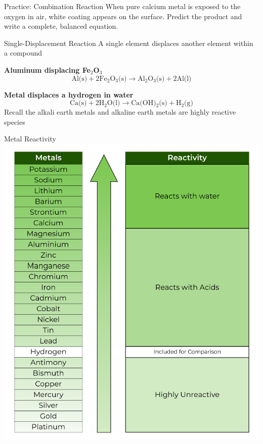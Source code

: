\documentclass[11pt]{beamer}
\begin{document}
\begin{frame}{Practice: Combination Reaction}
  When pure calcium metal is exposed to the oxygen in air, white coating appears
  on the surface. Predict the product and write a complete, balanced equation.
\end{frame}

\begin{frame}{Single-Displacement Reaction}
  A single element displaces another element within a compound

  \textbf{Aluminum displacing Fe$_2$O$_3$}
  \begin{equation}
    \text{Al(s)} + 2\text{Fe$_2$O$_3$(s)} \rightarrow \text{Al$_2$O$_3$(s)} + 2\text{Al(l)}
  \end{equation}
  
  \textbf{Metal displaces a hydrogen in water}
  \begin{equation}
    \text{Ca(s)} + 2\text{H$_2$O(l)} \rightarrow \text{Ca(OH)$_2$(s)} + \text{H$_2$(g)}
  \end{equation}
  Recall the alkali earth metals and alkaline earth metals are highly reactive
  species
\end{frame}

\begin{frame}{Metal Reactivity}
  \centering
  \includegraphics[scale=0.3]{metal_reactivity}
\end{frame}
\end{document}
